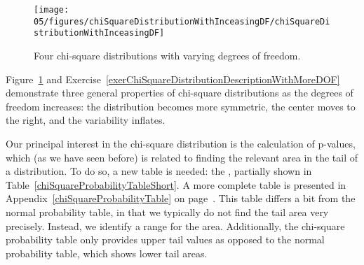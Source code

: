 \begin{figure}[h]
\centering
\texttt{[image: 05/figures/chiSquareDistributionWithInceasingDF/chiSquareDistributionWithInceasingDF]}
\caption{Four chi-square distributions with varying degrees of freedom.}
\label{chiSquareDistributionWithInceasingDF}
\end{figure}

Figure~\ref{chiSquareDistributionWithInceasingDF} and Exercise~\ref{exerChiSquareDistributionDescriptionWithMoreDOF} demonstrate three general properties of chi-square distributions as the degrees of freedom increases: the distribution becomes more symmetric, the center moves to the right, and the variability inflates.

Our principal interest in the chi-square distribution is the calculation of p-values, which (as we have seen before) is related to finding the relevant area in the tail of a distribution. To do so, a new table is needed: the , partially shown in Table~\ref{chiSquareProbabilityTableShort}. A more complete table is presented in Appendix~\ref{chiSquareProbabilityTable} on page~\pageref{chiSquareProbabilityTable}. This table differs a bit from the normal probability table, in that we typically do not find the tail area very precisely. Instead, we identify a range for the area. Additionally, the chi-square probability table only provides upper tail values as opposed to the normal probability table, which shows lower tail areas.

